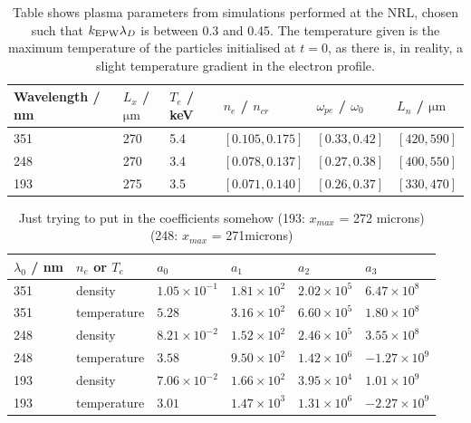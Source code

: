 \renewcommand{\arraystretch}{1.25}
\begin{table}[h]
\begin{center}
\begin{tabular}{|l|l|l|l|l|l|}
\hline
Wavelength / nm & $L_x$ /$\si{\micro\metre}$ & $T_e$ / keV & $n_e$ / $n_{cr}$ & $\omega_{pe}$ / $\omega_0$ & $L_n$ / $\si{\micro\metre}$
\\ \hline 
351 & 270 & 5.4 & $[0.105,0.175]$ & $[0.33,0.42]$ & $[420,590]$ \\ \hline
248 & 270 & 3.4 & $[0.078,0.137]$ & $[0.27,0.38]$ & $[400,550]$ \\ \hline
193 & 275 & 3.5 & $[0.071,0.140]$ & $[0.26,0.37]$ & $[330,470]$ \\ \hline
\end{tabular}
\end{center}
\caption{Table shows plasma parameters from simulations performed at the NRL, chosen such that $k_\mathrm{EPW}\lambda_D$ is between 0.3 and 0.45. The temperature given is the maximum temperature of the particles initialised at $t=0$, as there is, in reality, a slight temperature gradient in the electron profile.}
\label{tab:plasma}
\end{table}

\renewcommand{\arraystretch}{1.25}
\begin{table}[h]
\begin{center}
\begin{tabular}{|l|l|l|l|l|l|}
\hline
$\lambda_0$ / nm & $n_e$ or $T_e$ & $a_0$ & $a_1$ & $a_2$ & $a_3$
\\ \hline 
351 & density & $1.05 \times 10^{-1}$  & $1.81 \times 10^2$ & $2.02 \times 10^5$ & $6.47 \times 10^8$ \\ \hline
351 & temperature & $5.28$ & $3.16 \times 10^2$ & $6.60 \times 10^5$ & $1.80\times 10^8$ \\ \hline
248 & density & $8.21 \times 10^{-2}$ & $1.52 \times 10^2$ & $2.46 \times 10^5$ & $3.55\times 10^8$  \\ \hline
248 & temperature & $3.58$ & $9.50 \times 10^2$ & $1.42\times 10^6$ & $-1.27 \times 10^9$ \\ \hline
 193 & density & $7.06\times 10^{-2}$ & $1.66\times 10^2$ & $3.95\times 10^4$ & $1.01\times 10^9$\\ \hline
 193 & temperature & $3.01$ & $1.47 \times 10^3$ & $1.31\times 10^6$ & $-2.27\times 10^9$ \\ \hline
\end{tabular}
\end{center}
\caption{Just trying to put in the coefficients somehow (193: $x_{max}$ = 272 microns) (248: $x_{max}$ = 271microns)}
\label{tab:coeffs}
\end{table}


